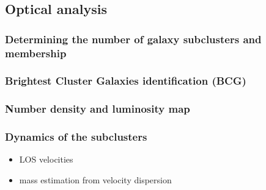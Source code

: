 \documentclass[letterpaper,useAMS,usenatbib]{mn2e}
\begin{document}
\subsection{Optical analysis}
\subsubsection{Determining the number of galaxy subclusters and membership}
\subsubsection{Brightest Cluster Galaxies identification (BCG)}
\subsubsection{Number density and luminosity map}

% 
% 
% 

\subsubsection{Dynamics of the subclusters}
\begin{itemize}
		\item LOS velocities
		\item mass estimation from velocity dispersion 
\end{itemize}
\end{document}
